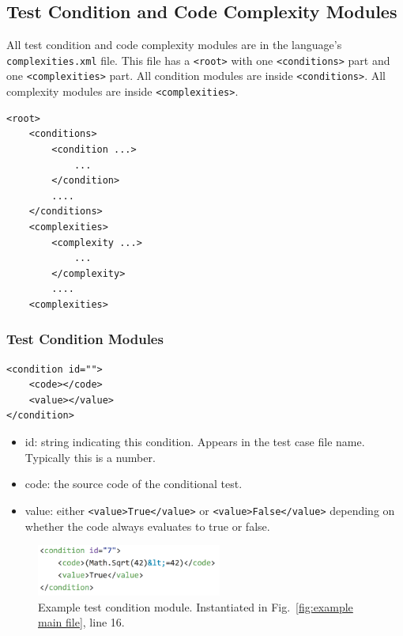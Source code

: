 \documentclass[12pt]{article}
\begin{document}
\subsection{Test Condition and Code Complexity Modules}

All test condition and code complexity modules are in the 
language's \verb|complexities.xml| file.  This file has
a \verb|<root>| with one \verb|<conditions>| part and one
\verb|<complexities>| part.
All condition modules are inside \verb|<conditions>|.  All
complexity modules are inside \verb|<complexities>|.

\begin{verbatim}
<root>
    <conditions>
        <condition ...>
            ...
        </condition>
        ....
    </conditions>
    <complexities>
        <complexity ...>
            ...
        </complexity>
        ....
    <complexities>
\end{verbatim}

\subsubsection{Test Condition Modules}
\label{sec: condition modules}

\begin{verbatim}
<condition id="">
    <code></code>
    <value></value>
</condition>
\end{verbatim}

\begin{itemize}
    \item id: string indicating this condition.  Appears in the test case
      file name.  Typically this is a number.

    \item code: the source code of the conditional test.

    \item value: either \verb|<value>True</value>| or
        \verb|<value>False</value>| depending on \\
        whether the code always evaluates to true or false.
\end{itemize}

\begin{figure}[htbp]
  \includegraphics[width=2.4in]{fig_Complexity_file_test.png}
  \caption{Example test condition module.  Instantiated in
    Fig.~\ref{fig:example main file}, line 16.}
  \label{fig:example complexity-test file}
\end{figure}
\end{document}

